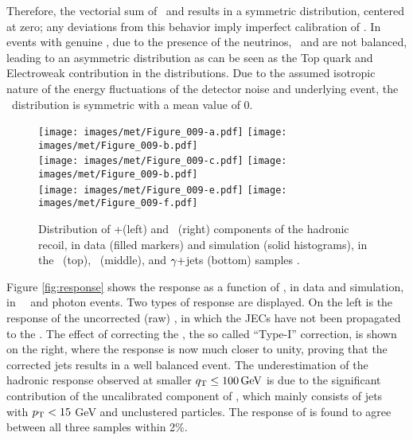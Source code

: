 Therefore, the vectorial sum of \upar\ and \qt results in a symmetric distribution, centered at zero; any deviations from this behavior imply imperfect calibration of \ptmiss. 
In events with genuine \ptmiss, due to the presence of the neutrinos, \upar\ and \qt are not balanced, leading to an asymmetric distribution as can be seen as the Top quark and Electroweak contribution in the distributions. 
Due to the assumed isotropic nature of the energy fluctuations of the detector noise and underlying event, the \uperp\ distribution is symmetric with a mean value of 0. 
\begin{figure}[htbp!]
  \centering
  \texttt{[image: images/met/Figure\_009-a.pdf]}
  \texttt{[image: images/met/Figure\_009-b.pdf]}\\
  \texttt{[image: images/met/Figure\_009-c.pdf]}
  \texttt{[image: images/met/Figure\_009-b.pdf]}\\
  \texttt{[image: images/met/Figure\_009-e.pdf]}
  \texttt{[image: images/met/Figure\_009-f.pdf]}
  \caption{Distribution of \upar+\qt (left) and \uperp\ (right) components of the hadronic recoil, in data (filled markers) and simulation (solid histograms), in the \Zmm\ (top), \Zee\ (middle), and $\gamma+$jets (bottom) samples \cite{Sirunyan:2019kia}.} 
  \label{fig:uparuperp}
\end{figure}
\newpara
\noindent\justify
Figure \ref{fig:response} shows the \ptmiss response as a function of \qt, in data and simulation, in \Zmm\, \Zee\, and photon events. 
Two types of response are displayed. 
On the left is the response of the uncorrected (raw) \ptmiss, in which the JECs have not been propagated to the \ptmiss. 
The effect of correcting the \ptmiss, the so called ``Type-I'' correction, is shown on the right, where the response is now much closer to unity, proving that the corrected jets results in a well balanced event. 
The underestimation of the hadronic response observed at smaller ${q}_{\mathrm T} \leq 100\,\text{Ge\hspace{-.08em}V}$ is due to the significant contribution of the uncalibrated component of \ptmiss, which mainly consists of jets with $p_{\mathrm{T}} < 15$ GeV and unclustered particles. 
The response of \ptmiss is found to agree between all three samples within 2\%. 
\newpara
\noindent\justify
